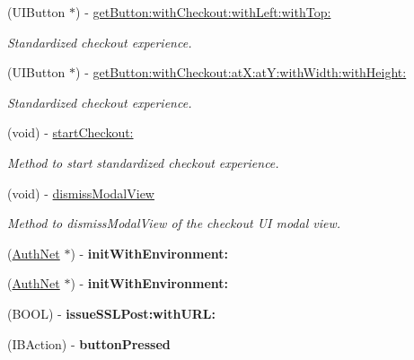 \begin{DoxyCompactItemize}
(UIButton $\ast$) -\/ \hyperlink{interface_auth_net_af2379b1db2c4a14d5dda010f81a2c3cb}{getButton:withCheckout:withLeft:withTop:}
\begin{DoxyCompactList}\small\item\em Standardized checkout experience. \item\end{DoxyCompactList}\item 
(UIButton $\ast$) -\/ \hyperlink{interface_auth_net_a14b9eb10d8c3702b4f89eac53076c621}{getButton:withCheckout:atX:atY:withWidth:withHeight:}
\begin{DoxyCompactList}\small\item\em Standardized checkout experience. \item\end{DoxyCompactList}\item 
(void) -\/ \hyperlink{interface_auth_net_a20baaa2b91fc9778de02bef1d007cda4}{startCheckout:}
\begin{DoxyCompactList}\small\item\em Method to start standardized checkout experience. \item\end{DoxyCompactList}\item 
(void) -\/ \hyperlink{interface_auth_net_ab910773060178d13fbc24394f9bc1ab1}{dismissModalView}
\begin{DoxyCompactList}\small\item\em Method to dismissModalView of the checkout UI modal view. \item\end{DoxyCompactList}\item 
\hypertarget{interface_auth_net_a807fcfb56537622a9d703c0cc5620097}{
(\hyperlink{interface_auth_net}{AuthNet} $\ast$) -\/ {\bfseries initWithEnvironment:}}
\label{interface_auth_net_a807fcfb56537622a9d703c0cc5620097}

\item 
\hypertarget{interface_auth_net_a807fcfb56537622a9d703c0cc5620097}{
(\hyperlink{interface_auth_net}{AuthNet} $\ast$) -\/ {\bfseries initWithEnvironment:}}
\label{interface_auth_net_a807fcfb56537622a9d703c0cc5620097}

\item 
\hypertarget{interface_auth_net_ab2e16a9a3336ca1015e4db66811971e0}{
(BOOL) -\/ {\bfseries issueSSLPost:withURL:}}
\label{interface_auth_net_ab2e16a9a3336ca1015e4db66811971e0}

\item 
\hypertarget{interface_auth_net_a0c4fe24c94b6962d16fcbba424252417}{
(IBAction) -\/ {\bfseries buttonPressed}}
\label{interface_auth_net_a0c4fe24c94b6962d16fcbba424252417}


\end{DoxyCompactItemize}
